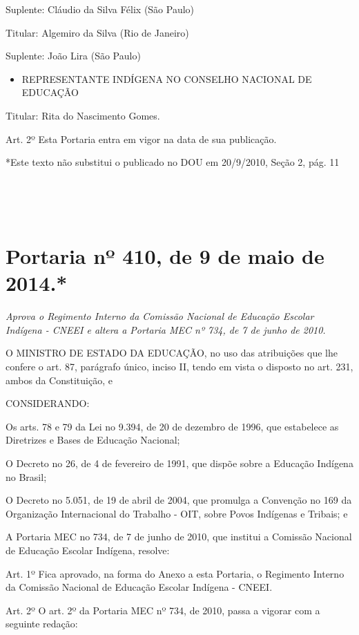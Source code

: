 \documentclass[
]{book}
\providecommand{\tightlist}{%
  \setlength{\itemsep}{0pt}\setlength{\parskip}{0pt}}
\begin{document}
Suplente: Cláudio da Silva Félix (São Paulo)

Titular: Algemiro da Silva (Rio de Janeiro)

Suplente: João Lira (São Paulo)

\begin{itemize}
\tightlist
\item
  REPRESENTANTE INDÍGENA NO CONSELHO NACIONAL DE EDUCAÇÃO
\end{itemize}

Titular: Rita do Nascimento Gomes.

Art. 2º Esta Portaria entra em vigor na data de sua publicação.

*Este texto não substitui o publicado no DOU em 20/9/2010, Seção 2, pág. 11

~

~

\hypertarget{portaria-nuxba-410-de-9-de-maio-de-2014.}{%
\section{Portaria nº 410, de 9 de maio de 2014.*}\label{portaria-nuxba-410-de-9-de-maio-de-2014.}}

\emph{Aprova o Regimento Interno da Comissão Nacional de Educação Escolar Indígena - CNEEI e altera a Portaria MEC nº 734, de 7 de junho de 2010.}

O MINISTRO DE ESTADO DA EDUCAÇÃO, no uso das atribuições que lhe confere o art. 87, parágrafo único, inciso II, tendo em vista o disposto no art. 231, ambos da Constituição, e

CONSIDERANDO:

Os arts. 78 e 79 da Lei no 9.394, de 20 de dezembro de 1996, que estabelece as Diretrizes e Bases de Educação Nacional;

O Decreto no 26, de 4 de fevereiro de 1991, que dispõe sobre a Educação Indígena no Brasil;

O Decreto no 5.051, de 19 de abril de 2004, que promulga a Convenção no 169 da Organização Internacional do Trabalho - OIT, sobre Povos Indígenas e Tribais; e

A Portaria MEC no 734, de 7 de junho de 2010, que institui a Comissão Nacional de Educação Escolar Indígena, resolve:

Art. 1º Fica aprovado, na forma do Anexo a esta Portaria, o Regimento Interno da Comissão Nacional de Educação Escolar Indígena - CNEEI.

Art. 2º O art. 2º da Portaria MEC nº 734, de 2010, passa a vigorar com a seguinte redação:
\end{document}
